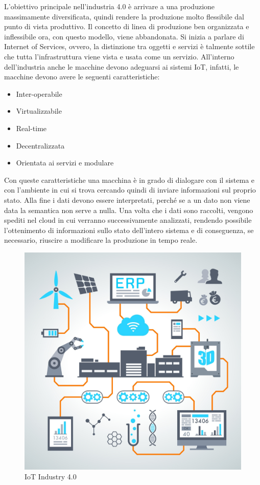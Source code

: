 \documentclass[10pt,a4paper,oneside]{scrbook}
\begin{document}
\begin{itemize}
        L'obiettivo principale nell'industria 4.0 è arrivare a una produzione massimamente diversificata, quindi rendere la produzione molto flessibile
        dal punto di vista produttivo. Il concetto di linea di produzione ben organizzata e inflessibile ora, con questo modello, viene abbandonata.
        Si inizia a parlare di Internet of Services, ovvero, la distinzione tra oggetti e servizi è talmente sottile che tutta l'infrastruttura viene vista e usata
        come un servizio.
        All'interno dell'industria anche le macchine devono adeguarsi ai sistemi IoT, infatti, le macchine devono avere le seguenti caratteristiche:
        \begin{itemize}
            \item {Inter-operabile}
            \item {Virtualizzabile}
            \item {Real-time}
            \item {Decentralizzata}
            \item {Orientata ai servizi e modulare}
        \end{itemize}
        Con queste caratteristiche una macchina è in grado di dialogare con il sistema e con l'ambiente in cui si trova cercando quindi di inviare
        informazioni sul proprio stato.
        Alla fine i dati devono essere interpretati, perché se a un dato non viene data la semantica non serve a nulla. 
        Una volta che i dati sono raccolti, vengono spediti nel cloud in cui verranno successivamente analizzati, rendendo possibile l'ottenimento di informazioni
        sullo stato dell'intero sistema e di conseguenza, se necessario, riuscire a modificare la produzione in tempo reale.
        \begin{figure}[h]
            \centering
            \includegraphics[width=0.5\linewidth]{img/industry.jpg}
            \caption{IoT Industry 4.0}
            \label{fig:IIoT}
        \end{figure}
    \end{itemize}
    \pagebreak
\end{document}

